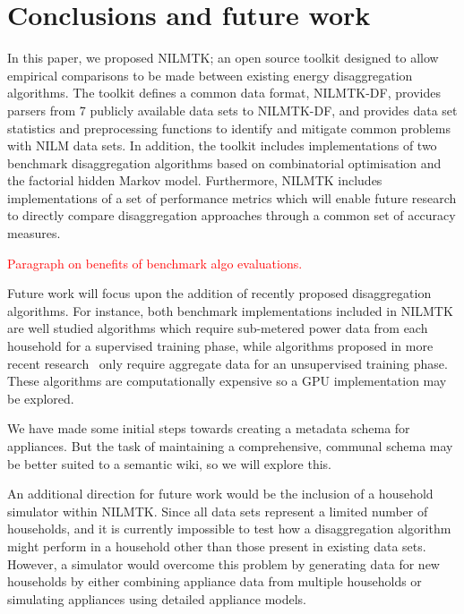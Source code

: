 \documentclass{sig-alternate}
\newcommand{\redcolor}[1]{\textcolor{red}{#1}}
\begin{document}
\section{Conclusions and future work}
\label{sec:conclusions}

\noindent
In this paper, we proposed NILMTK; an open source toolkit designed to allow empirical comparisons to be made between existing energy disaggregation algorithms. The toolkit defines a common data format, NILMTK-DF, provides parsers from 7 publicly available data sets to NILMTK-DF, and provides data set statistics and preprocessing functions to identify and mitigate common problems with NILM data sets. In addition, the toolkit includes implementations of two benchmark disaggregation algorithms based on combinatorial optimisation and the factorial hidden Markov model. Furthermore, NILMTK includes implementations of a set of performance metrics which will enable future research to directly compare disaggregation approaches through a common set of accuracy measures.

\redcolor{Paragraph on benefits of benchmark algo evaluations.}

Future work will focus upon the addition of recently proposed disaggregation algorithms. For instance, both benchmark implementations included in NILMTK are well studied algorithms which require sub-metered power data from each household for a supervised training phase, while algorithms proposed in more recent research~\cite{kim_2011,parson_2012} only require aggregate data for an unsupervised training phase.  These algorithms are computationally expensive so a GPU implementation may be explored.

We have made some initial steps towards creating a metadata schema for appliances.  But the task of maintaining a comprehensive, communal schema may be better suited to a semantic wiki, so we will explore this.

An additional direction for future work would be the inclusion of a household simulator within NILMTK. Since all data sets represent a limited number of households, and it is currently impossible to test how a disaggregation algorithm might perform in a household other than those present in existing data sets. However, a simulator would overcome this problem by generating data for new households by either combining appliance data from multiple households or simulating appliances using detailed appliance models.

\end{document}
